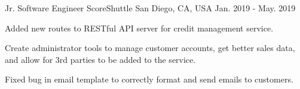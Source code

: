 \begin{cventries}
	\cventry
	{Jr. Software Engineer} %
	{ScoreShuttle} %
	{San Diego, CA, USA} %
	{Jan. 2019 - May. 2019} %
	{
		\begin{cvitems} %
			\item {Added new routes to RESTful API server for credit management service.}
			\item {Create administrator tools to manage customer accounts, get better sales data, and allow for 3rd parties to be added to the service.}
			\item {Fixed bug in email template to correctly format and send emails to customers.}
		\end{cvitems}
	}

\end{cventries}
